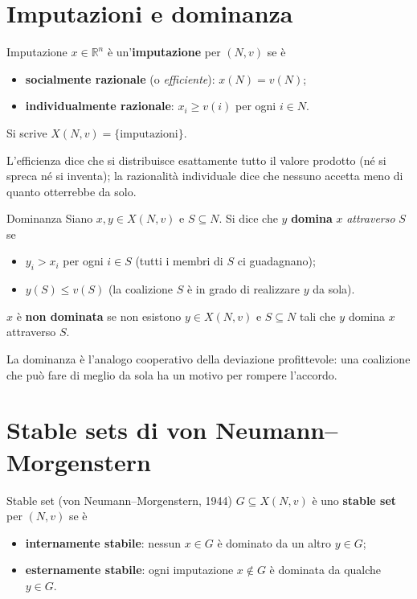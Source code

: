 \documentclass[12pt,a4paper,twoside]{book}
\theoremstyle{plain}
\theoremstyle{definition}
\begin{document}
\section{Imputazioni e dominanza}

\begin{defbox}{Imputazione}
$x\in\mathbb{R}^n$ è un'\textbf{imputazione} per $(N,v)$ se è
\begin{itemize}
  \item \textbf{socialmente razionale} (o \emph{efficiente}): $x(N)=v(N)$;
  \item \textbf{individualmente razionale}: $x_i\ge v(i)$ per ogni $i\in N$.
\end{itemize}
Si scrive $X(N,v)=\{\text{imputazioni}\}$.
\end{defbox}

L'efficienza dice che si distribuisce esattamente tutto il valore prodotto (né
si spreca né si inventa); la razionalità individuale dice che nessuno accetta
meno di quanto otterrebbe da solo.

\begin{defbox}{Dominanza}
Siano $x,y\in X(N,v)$ e $S\subseteq N$. Si dice che $y$ \textbf{domina} $x$
\emph{attraverso} $S$ se
\begin{itemize}
  \item $y_i>x_i$ per ogni $i\in S$ \quad (tutti i membri di $S$ ci guadagnano);
  \item $y(S)\le v(S)$ \quad (la coalizione $S$ è in grado di realizzare $y$ da sola).
\end{itemize}
$x$ è \textbf{non dominata} se non esistono $y\in X(N,v)$ e $S\subseteq N$ tali
che $y$ domina $x$ attraverso $S$.
\end{defbox}

La dominanza è l'analogo cooperativo della deviazione profittevole: una
coalizione che può fare di meglio da sola ha un motivo per rompere l'accordo.

\section{Stable sets di von Neumann--Morgenstern}

\begin{defbox}{Stable set (von Neumann--Morgenstern, 1944)}
$G\subseteq X(N,v)$ è uno \textbf{stable set} per $(N,v)$ se è
\begin{itemize}
  \item \textbf{internamente stabile}: nessun $x\in G$ è dominato da un altro $y\in G$;
  \item \textbf{esternamente stabile}: ogni imputazione $x\notin G$ è dominata da qualche $y\in G$.
\end{itemize}
\end{defbox}
\end{document}
